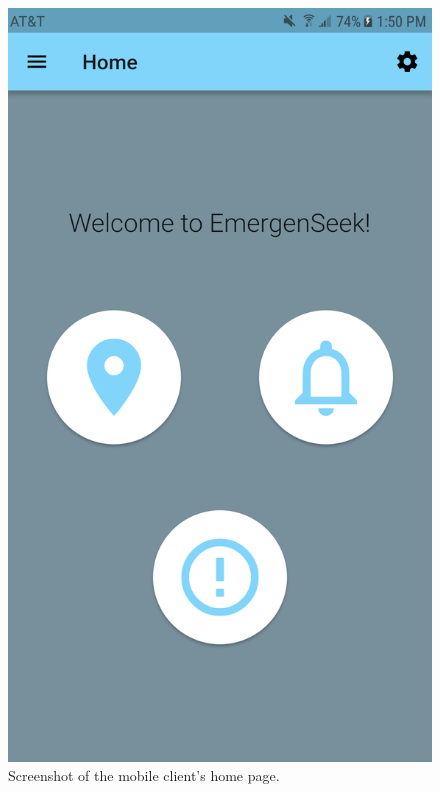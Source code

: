 \documentclass[10pt, a4paper]{article}
\begin{document}
\begin{figure}[!htb]
  \includegraphics[width=\linewidth]{demo_home.png}
  \caption{Screenshot of the mobile client's home page.}\label{fig:mobile1}
\endminipage\hfill
{}

\end{figure}
\end{document}
